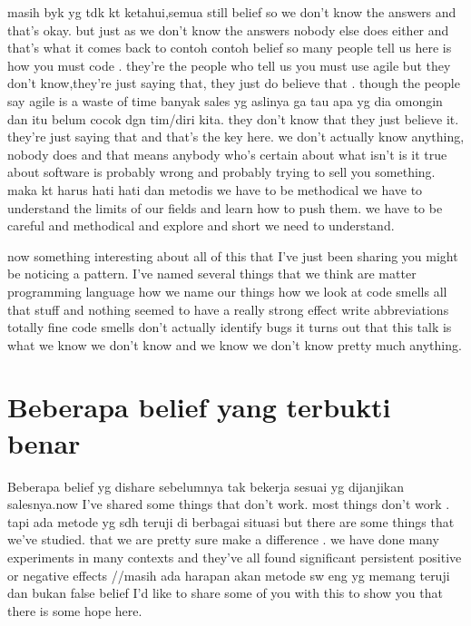 \documentclass[conference, compsoc, twoside]{IEEEtran}
\begin{document}
masih byk yg tdk kt ketahui,semua still belief
so we don’t know
 the answers and that’s okay. 
but just as we don’t know the
 answers nobody else does either and that’s what it comes
 back to 
 contoh contoh belief
so many people tell us 
here is how you must code
.
they’re the people who tell us you must use agile but they
 don’t know,they’re just saying that, they just do believe that
.
though the people say agile is a waste of time 
 banyak sales yg aslinya ga tau apa yg dia omongin dan itu belum cocok dgn tim/diri kita. 
they don’t
 know that they just believe it. they’re just saying that and
that’s the key here.
 we don’t actually know anything, nobody
does
 and that means anybody who’s certain about what isn’t
 is it true about software is probably wrong and probably
 trying to sell you something.
 maka kt harus hati hati dan metodis
we have to be methodical 
we
 have to understand the limits of our fields and learn how
 to push them.
 we have to be careful and methodical and
explore and short we need to understand.


now something interesting about all of this that I've just been sharing you might be noticing a pattern. 
I've named several things that we think are matter programming language how we name our things how we look at code smells all that stuff and nothing seemed to have a really strong effect write abbreviations totally fine code smells don't actually identify bugs it turns out that this talk is what we know we don't know and we know we don't know pretty much anything.  
\section{Beberapa belief yang terbukti benar}
Beberapa belief yg dishare sebelumnya tak bekerja sesuai yg dijanjikan salesnya.now I’ve shared some things that don’t work.  
most things don’t work .
tapi ada metode yg sdh teruji di berbagai situasi
 but
 there are some things that we’ve studied.
  that we are pretty
 sure make a difference .
 we have done many experiments in
many contexts and they’ve all found significant persistent
 positive or negative effects
//masih ada harapan akan metode sw eng yg memang teruji dan bukan false belief
 I’d like to share some of you
with this to show you that there is some hope here.
\end{document}

